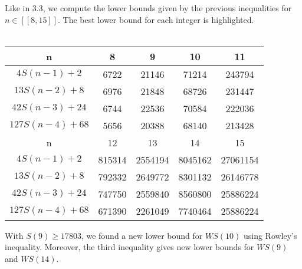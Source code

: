 Like in 3.3, we compute the lower bounds given by the previous inequalities for \( n \in [\![8,15]\!] \). The best lower bound 
for each integer is highlighted.\\
\\
\begin{center}
\begin{tabular}{|*{5}{c|}}
    \hline
	n & 8 & 9 & 10 & 11 \\
	\hline
	\(4S(n-1) + 2 \) & 6722 & 21146 & \cellcolor{yellow} 71214 & \cellcolor{yellow} 243794\\
	\hline
	\(13S(n-2) + 8 \) & \cellcolor{yellow} 6976 & 21848 & 68726 & 231447\\
	\hline
	\(42S(n-3) + 24 \) & 6744 & \cellcolor{yellow} 22536 & 70584 & 222036 \\
	\hline
	\(127S(n-4) + 68 \) & 5656 & 20388 & 68140 & 213428\\
	\hline
	\hline
	n & 12 & 13 & 14 & 15 \\
	\hline
	\(4S(n-1) + 2 \) & \cellcolor{yellow} 815314 & 2554194 & 8045162 & \cellcolor{yellow} 27061154\\
	\hline
	\(13S(n-2) + 8 \) & 792332 & \cellcolor{yellow}2649772 & 8301132 & 26146778 \\
	\hline
	\(42S(n-3) + 24 \) & 747750 & 2559840 & \cellcolor{yellow} 8560800 &  25886224 \\
	\hline
	\(127S(n-4) + 68 \) & 671390 & 2261049 & 7740464 & 25886224 \\
	\hline
\end{tabular}
\end{center}

With \( S(9) \geqslant 17803 \), we found a new lower bound for \(WS(10)\) using Rowley's inequality. 
Moreover, the third inequality gives new lower bounds for \(WS(9)\) and \(WS(14)\).
